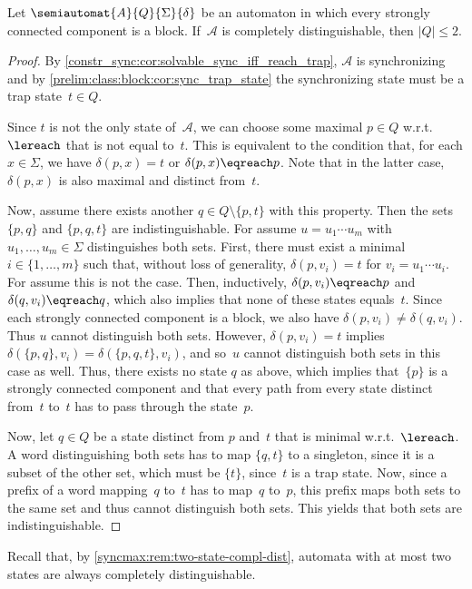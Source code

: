 \begin{theorem} \label{syncmax:thm:solvable-cd}
	Let $\semiautomat{A}{Q}{\Sigma}{\delta}$ be an automaton in which every strongly connected component is a block.
	If~$\mathcal A$ is completely distinguishable,
	then $|Q| \le 2$.		
\end{theorem}
\begin{proof}
	By \cref{constr_sync:cor:solvable_sync_iff_reach_trap}, $\mathcal A$ is synchronizing
	and by \cref{prelim:class:block:cor:sync_trap_state} the synchronizing
	state must be a trap state~$t \in Q$. %
	
	Since $t$ is not the only state of~$\mathcal A$,
	we can choose some maximal $p \in Q$ w.r.t.~$\lereach$
	that is not equal to~$t$.
	This is equivalent to the condition
	that, for each $x \in \Sigma$, we have $\delta(p, x) = t$
	or $\delta(p, x) \eqreach p$. Note that in the latter case,
	$\delta(p,x)$ is also maximal and distinct from~$t$.
	
	Now, assume there exists another $q \in Q \setminus \{p,t\}$
	with this property.
	Then the sets $\{p,q\}$ and $\{p,q,t\}$ are indistinguishable.
	For assume $u = u_1 \cdots u_m$ with $u_1, \ldots, u_m \in \Sigma$
	distinguishes both sets.
	First, there must exist a minimal $i \in \{1,\ldots,m\}$
	such that, without loss of generality,
	$\delta(p, v_i) = t$ for $v_i = u_1 \cdots u_i$. 
	For assume this is not the case.
	Then, inductively, $\delta(p, v_i) \eqreach p$
	and $\delta(q, v_i) \eqreach q$,
	which also implies that none of these states equals~$t$.
	Since each strongly connected component is a block,
	we also have $\delta(p, v_i) \ne \delta(q, v_i)$.
	Thus $u$ cannot distinguish both sets.
	However, $\delta(p, v_i) = t$
	implies  $\delta(\{p,q\}, v_i) = \delta(\{p,q,t\}, v_i)$,
	and so~$u$ cannot distinguish both sets in this case as well.
	Thus, there exists no state $q$ as above, which 
	implies that~$\{p\}$ is a strongly connected
	component and that every path from every state distinct from~$t$ to~$t$
	has to pass through the state~$p$.
	
	Now, let $q \in Q$ be a state distinct from $p$ and~$t$
	that is minimal w.r.t.~$\lereach$.
	A word distinguishing both sets has to map $\{q,t\}$
	to a singleton, since it is a subset of the other set,
	which must be $\{t\}$, since~$t$ is a trap state.
	Now, since a prefix of a word mapping~$q$ to~$t$ has to map~$q$ to~$p$,
	this prefix maps both sets to the same set
	and thus cannot distinguish both sets.
	This yields that both sets are indistinguishable.
\end{proof}

Recall that, by \cref{syncmax:rem:two-state-compl-dist}, automata with at most two states are 
always completely distinguishable.